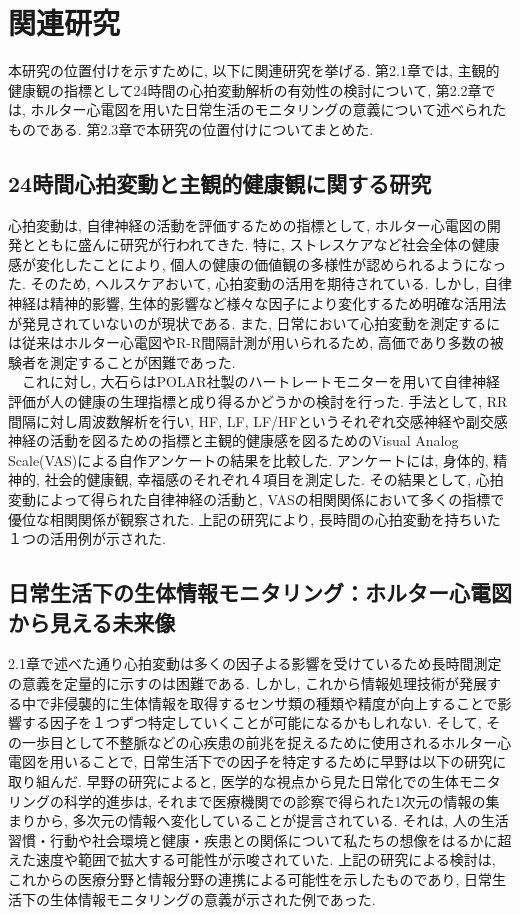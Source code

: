 \documentclass[report, 11pt, a4paper]{jsbook}
\begin{document}
\chapter{関連研究}
本研究の位置付けを示すために, 以下に関連研究を挙げる. 第2.1章では, 主観的健康観の指標として24時間の心拍変動解析の有効性の検討について, 第2.2章では, ホルター心電図を用いた日常生活のモニタリングの意義について述べられたものである. 第2.3章で本研究の位置付けについてまとめた.

\section{24時間心拍変動と主観的健康観に関する研究}
心拍変動は, 自律神経の活動を評価するための指標として, ホルター心電図の開発とともに盛んに研究が行われてきた. 特に, ストレスケアなど社会全体の健康感が変化したことにより, 個人の健康の価値観の多様性が認められるようになった. そのため, ヘルスケアおいて, 心拍変動の活用を期待されている. しかし, 自律神経は精神的影響, 生体的影響など様々な因子により変化するため明確な活用法が発見されていないのが現状である. 
また, 日常において心拍変動を測定するには従来はホルター心電図やR-R間隔計測が用いられるため, 高価であり多数の被験者を測定することが困難であった.\\
~~これに対し, 大石らはPOLAR社製のハートレートモニターを用いて自律神経評価が人の健康の生理指標と成り得るかどうかの検討を行った. 手法として, RR間隔に対し周波数解析を行い, HF, LF, LF/HFというそれぞれ交感神経や副交感神経の活動を図るための指標と主観的健康感を図るためのVisual Analog Scale(VAS)による自作アンケートの結果を比較した. アンケートには, 身体的, 精神的, 社会的健康観, 幸福感のそれぞれ４項目を測定した. その結果として, 心拍変動によって得られた自律神経の活動と, VASの相関関係において多くの指標で優位な相関関係が観察された. 上記の研究により, 長時間の心拍変動を持ちいた１つの活用例が示された. 

\section{日常生活下の生体情報モニタリング：ホルター心電図から見える未来像}
2.1章で述べた通り心拍変動は多くの因子よる影響を受けているため長時間測定の意義を定量的に示すのは困難である. しかし, これから情報処理技術が発展する中で非侵襲的に生体情報を取得するセンサ類の種類や精度が向上することで影響する因子を１つずつ特定していくことが可能になるかもしれない. そして, その一歩目として不整脈などの心疾患の前兆を捉えるために使用されるホルター心電図を用いることで, 日常生活下での因子を特定するために早野は以下の研究に取り組んだ. 
早野の研究によると, 医学的な視点から見た日常化での生体モニタリングの科学的進歩は, それまで医療機関での診察で得られた1次元の情報の集まりから, 多次元の情報へ変化していることが提言されている. それは, 人の生活習慣・行動や社会環境と健康・疾患との関係について私たちの想像をはるかに超えた速度や範囲で拡大する可能性が示唆されていた. 上記の研究による検討は, これからの医療分野と情報分野の連携による可能性を示したものであり, 日常生活下の生体情報モニタリングの意義が示された例であった.
\end{document}
